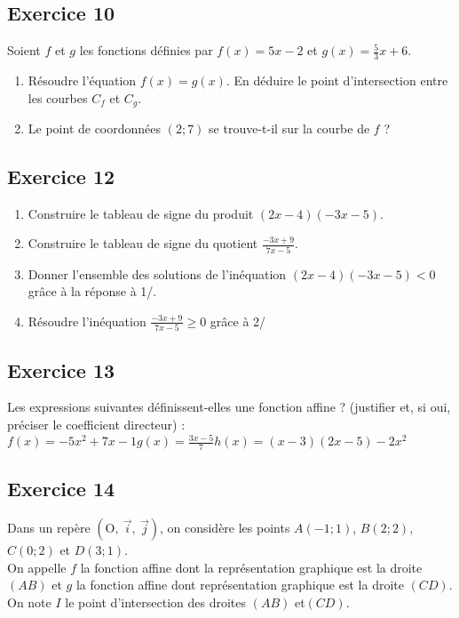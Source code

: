 \documentclass[12pt,a4paper]{article}
\def\Oij{$\left(\text{O},~\vec{i},~\vec{j}\right)$}
\begin{document}
\subsection*{Exercice 10}
Soient $f$ et $g$ les fonctions définies par $f(x)=5x-2$ et $g(x)=\frac{5}{3}x+6$.\medskip
\begin{enumerate}
\item Résoudre l'équation $f(x)=g(x)$. En déduire le point d'intersection entre les courbes $C_{f}$ et $C_{g}$.\medskip
\item Le point de coordonnées $(2;7)$ se trouve-t-il sur la courbe de $f$ ?\medskip 
\end{enumerate}

\vspace{0,5cm}

\subsection*{Exercice 12}
\begin{enumerate}
\item Construire le tableau de signe du produit $(2x-4)(-3x-5)$.\medskip
\item Construire le tableau de signe du quotient $\frac{-3x+9}{7x-5}$.\medskip
\item Donner l'ensemble des solutions de l'inéquation $(2x-4)(-3x-5)<0$ grâce à la réponse à 1/.\medskip
\item Résoudre l'inéquation $\frac{-3x+9}{7x-5}\geqslant0$ grâce à 2/
\end{enumerate}
\subsection*{Exercice 13}
Les expressions suivantes définissent-elles une fonction affine ? (justifier et, si oui, préciser le coefficient directeur) :\medskip\\
$f(x)=-5x^2+7x-1$\hfill $g(x)=\frac{3x-5}{7}$\hfill $h(x)=(x-3)(2x-5)-2x^2$


\subsection*{Exercice 14}

Dans un repère \Oij{}, on considère les points $A(-1;1)$, $B(2;2)$, $C(0;2)$ et $D(3;1)$.\\
On appelle $f$ la fonction affine dont la représentation graphique est la droite $(AB)$ et $g$ la fonction affine dont représentation graphique est la droite $(CD)$. On note $I$ le point d'intersection des droites $(AB)$ et$(CD)$.
\end{document}
